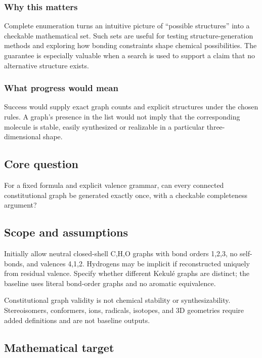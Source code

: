 \documentclass[
  11pt,
]{article}
\begin{document}
\subsubsection{Why this matters}

Complete enumeration turns an intuitive picture of ``possible
structures'' into a checkable mathematical set. Such sets are useful for
testing structure-generation methods and exploring how bonding
constraints shape chemical possibilities. The guarantee is especially
valuable when a search is used to support a claim that no alternative
structure exists.

\subsubsection{What progress would mean}

Success would supply exact graph counts and explicit structures under
the chosen rules. A graph's presence in the list would not imply that
the corresponding molecule is stable, easily synthesized or realizable
in a particular three-dimensional shape.

\subsection{Core question}

For a fixed formula and explicit valence grammar, can every connected
constitutional graph be generated exactly once, with a checkable
completeness argument?

\subsection{Scope and assumptions}

Initially allow neutral closed-shell C,H,O graphs with bond orders
1,2,3, no self-bonds, and valences 4,1,2. Hydrogens may be implicit if
reconstructed uniquely from residual valence. Specify whether different
Kekulé graphs are distinct; the baseline uses literal bond-order graphs
and no aromatic equivalence.

Constitutional graph validity is not chemical stability or
synthesizability. Stereoisomers, conformers, ions, radicals, isotopes,
and 3D geometries require added definitions and are not baseline
outputs.

\subsection{Mathematical target}
\end{document}
